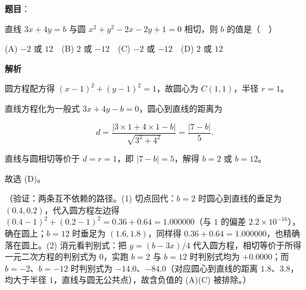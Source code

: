 \begin{answer}

\textbf{题目}：

直线 \(3x+4y=b\) 与圆 \(x^2+y^2-2x-2y+1=0\) 相切，则 \(b\) 的值是（　）

(A) \(-2\) 或 \(12\)　(B) \(2\) 或 \(-12\)　(C) \(-2\) 或 \(-12\)　(D) \(2\) 或 \(12\)

\textbf{解析}

圆方程配方得 \((x-1)^2+(y-1)^2=1\)，故圆心为 \(C(1,1)\)，半径 \(r=1\)。

直线方程化为一般式 \(3x+4y-b=0\)，圆心到直线的距离为

\nopagebreak[4]
\[
d=\dfrac{|3\times 1+4\times 1-b|}{\sqrt{3^2+4^2}}=\dfrac{|7-b|}{5}.
\]

直线与圆相切等价于 \(d=r=1\)，即 \(|7-b|=5\)，解得 \(b=2\) 或 \(b=12\)。

故选 (D)。

（验证：两条互不依赖的路径。(1) 切点回代：\(b=2\) 时圆心到直线的垂足为 \((0.4,0.2)\)，代入圆方程左边得 \((0.4-1)^2+(0.2-1)^2=0.36+0.64=1.000000\)（与 \(1\) 的偏差 \(2.2\times10^{-16}\)），确在圆上；\(b=12\) 时垂足为 \((1.6,1.8)\)，同样得 \(0.36+0.64=1.000000\)，也精确落在圆上。(2) 消元看判别式：把 \(y=(b-3x)/4\) 代入圆方程，相切等价于所得一元二次方程的判别式为 \(0\)，实跑 \(b=2\) 与 \(b=12\) 时判别式均为 \(+0.0000\)；而 \(b=-2\)、\(b=-12\) 时判别式为 \(-14.0\)、\(-84.0\)（对应圆心到直线的距离 \(1.8\)、\(3.8\)，均大于半径 \(1\)，直线与圆无公共点），故含负值的 (A)(C) 被排除。）


\end{answer}
